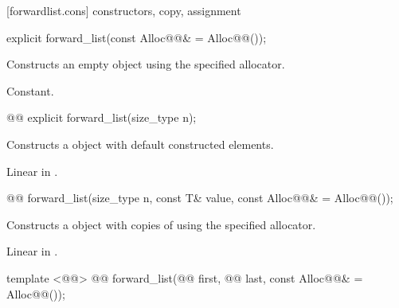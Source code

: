\documentclass[american,twoside]{book}
\begin{document}
[forwardlist.cons]{ constructors, copy, assignment}

\begin{itemdecl}
explicit forward_list(const Alloc@@& = Alloc@@());
\end{itemdecl}

\begin{itemdescr}
\pnum
\effects Constructs an empty  object using the specified allocator.

\pnum
\complexity Constant.
\end{itemdescr}

\begin{itemdecl}
@@ explicit forward_list(size_type n);
\end{itemdecl}

\begin{itemdescr}
\pnum
\effects Constructs a  object with  default constructed elements.

\pnum
{}

\pnum
\complexity Linear in .
\end{itemdescr}

\begin{itemdecl}
@@ 
  forward_list(size_type n, const T& value, const Alloc@@& = Alloc@@());
\end{itemdecl}

\begin{itemdescr}
\pnum
\effects Constructs a  object with  copies of  using the specified allocator.

\pnum
{}

\pnum
\complexity Linear in .
\end{itemdescr}

\begin{itemdecl}
template <@@>
  @@
  forward_list(@@ first, @@ last, 
               const Alloc@@& = Alloc@@()); 
\end{itemdecl}
\end{document}
